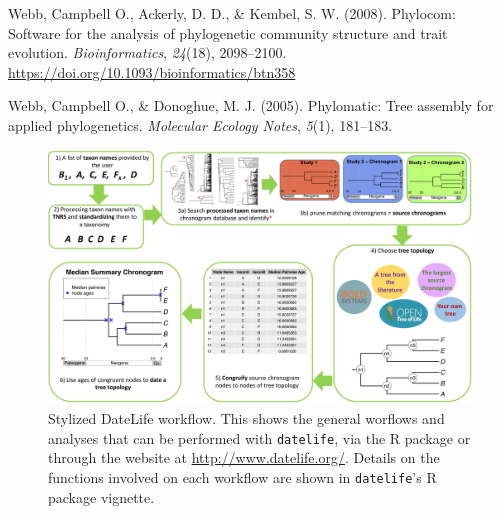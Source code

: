 \documentclass[
  english,
  man]{apa6}
\newlength{\cslhangindent}
\newlength{\cslentryspacingunit} %
\newenvironment{CSLReferences}[2] %
 {%
  \setlength{\parindent}{0pt}
  \ifodd #1
  \let\oldpar\par
  \def\par{\hangindent=\cslhangindent\oldpar}
  \fi
  \setlength{\parskip}{#2\cslentryspacingunit}
 }%
 {}
\begin{document}
\begin{CSLReferences}{1}{0}
\leavevmode{}%
Webb, Campbell O., Ackerly, D. D., \& Kembel, S. W. (2008). {Phylocom: Software for the analysis of phylogenetic community structure and trait evolution}. \emph{Bioinformatics}, \emph{24}(18), 2098--2100. \url{https://doi.org/10.1093/bioinformatics/btn358}

\leavevmode{}%
Webb, Campbell O., \& Donoghue, M. J. (2005). Phylomatic: Tree assembly for applied phylogenetics. \emph{{Molecular Ecology Notes}}, \emph{5}(1), 181--183.

\end{CSLReferences}

\endgroup




\begin{figure}[!h]
\includegraphics{../figures/figure1/figure1-new.pdf}
\caption{Stylized DateLife workflow. This shows the general worflows and analyses that can be performed with \texttt{datelife}, via the R package or through the website  at \url{http://www.datelife.org/}. Details on the functions involved on each workflow are shown in \texttt{datelife}'s R package vignette.
}
\label{fig:workflow}
\end{figure}
\end{document}
